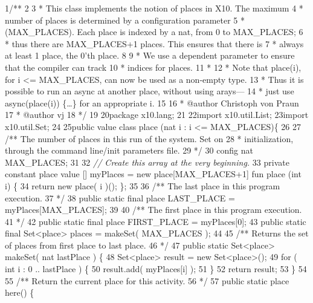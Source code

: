 \begin{tightcode}
\quad\num{1}/**
\quad\num{2}
\quad\num{3} * This class implements the notion of places in X10. The maximum
\quad\num{4} * number of places is determined by a configuration parameter
\quad\num{5} * (MAX\_PLACES). Each place is indexed by a nat, from 0 to MAX\_PLACES;
\quad\num{6} * thus there are MAX\_PLACES+1 places. This ensures that there is
\quad\num{7} * always at least 1 place, the 0'th place.
\quad\num{8}
\quad\num{9} * We use a dependent parameter to ensure that the compiler can track
\quad\num{10} * indices for places.
\quad\num{11} *
\quad\num{12} * Note that place(i), for i <= MAX\_PLACES, can now be used as a non-empty type.
\quad\num{13} * Thus it is possible to run an async at another place, without using arays---
\quad\num{14} * just use async(place(i)) \{\ldots{}\} for an appropriate i.
\quad\num{15}
\quad\num{16} * @author Christoph von Praun
\quad\num{17} * @author vj
\quad\num{18} */
\quad\num{19}
\quad\num{20}package x10.lang;
\quad\num{21}
\quad\num{22}import x10.util.List;
\quad\num{23}import x10.util.Set;
\quad\num{24}
\quad\num{25}public value class place (nat i : i <= MAX\_PLACES)\{
\quad\num{26}
\quad\num{27}    /** The number of places in this run of the system. Set on
\quad\num{28}     * initialization, through the command line/init parameters file.
\quad\num{29}     */
\quad\num{30}    config nat MAX\_PLACES;
\quad\num{31}
\quad\num{32}    \emph{// Create this array at the very beginning.}
\quad\num{33}    private constant place value [] myPlaces = new place[MAX\_PLACES+1] fun place (int i) \{
\quad\num{34}	return new place( i )(); \};
\quad\num{35}
\quad\num{36}    /** The last place in this program execution.
\quad\num{37}     */
\quad\num{38}    public static final place LAST\_PLACE = myPlaces[MAX\_PLACES];
\quad\num{39}
\quad\num{40}    /** The first place in this program execution.
\quad\num{41}     */
\quad\num{42}    public static final place FIRST\_PLACE = myPlaces[0];
\quad\num{43}    public static final Set<place> places = makeSet( MAX\_PLACES );
\quad\num{44}
\quad\num{45}    /** Returns the set of places from first place to last place.
\quad\num{46}     */
\quad\num{47}    public static Set<place> makeSet( nat lastPlace ) \{
\quad\num{48}	Set<place> result = new Set<place>();
\quad\num{49}	for ( int i : 0 .. lastPlace ) \{
\quad\num{50}	    result.add( myPlaces[i] );
\quad\num{51}	\}
\quad\num{52}	return result;
\quad\num{53}    \}
\quad\num{54}
\quad\num{55}    /**  Return the current place for this activity.
\quad\num{56}     */
\quad\num{57}    public static place here() \{

\end{tightcode}
